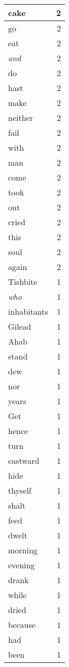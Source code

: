 \begin{center}
\begin{longtable}{l|r}
cake & 2\\ \hline 
go & 2\\ \hline 
eat & 2\\ \hline 
\emph{and} & 2\\ \hline 
do & 2\\ \hline 
hast & 2\\ \hline 
make & 2\\ \hline 
neither & 2\\ \hline 
fail & 2\\ \hline 
with & 2\\ \hline 
man & 2\\ \hline 
come & 2\\ \hline 
took & 2\\ \hline 
out & 2\\ \hline 
cried & 2\\ \hline 
this & 2\\ \hline 
soul & 2\\ \hline 
again & 2\\ \hline 
Tishbite & 1\\ \hline 
\emph{who} & 1\\ \hline 
inhabitants & 1\\ \hline 
Gilead & 1\\ \hline 
Ahab & 1\\ \hline 
stand & 1\\ \hline 
dew & 1\\ \hline 
nor & 1\\ \hline 
years & 1\\ \hline 
Get & 1\\ \hline 
hence & 1\\ \hline 
turn & 1\\ \hline 
eastward & 1\\ \hline 
hide & 1\\ \hline 
thyself & 1\\ \hline 
shalt & 1\\ \hline 
feed & 1\\ \hline 
dwelt & 1\\ \hline 
morning & 1\\ \hline 
evening & 1\\ \hline 
drank & 1\\ \hline 
while & 1\\ \hline 
dried & 1\\ \hline 
because & 1\\ \hline 
had & 1\\ \hline 
been & 1\\ \hline 

\end{longtable}
\end{center}
